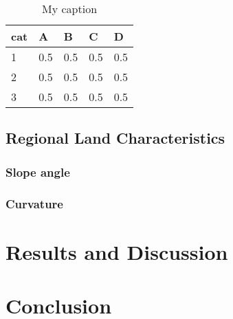 \documentclass[10pt]{article}
\begin{document}
\begin{table}[]
\centering
\caption{My caption}
\label{my-label}
\begin{tabular}{lllll}
\hline
cat & A   & B   & C   & D   \\ \hline
1   & 0.5 & 0.5 & 0.5 & 0.5 \\
2   & 0.5 & 0.5 & 0.5 & 0.5 \\
3   & 0.5 & 0.5 & 0.5 & 0.5 \\ \hline
\end{tabular}
\end{table}


\subsection{Regional Land Characteristics}
\subsubsection{Slope angle}
\subsubsection{Curvature}

\section{Results and Discussion}

\section{Conclusion}
\end{document}

